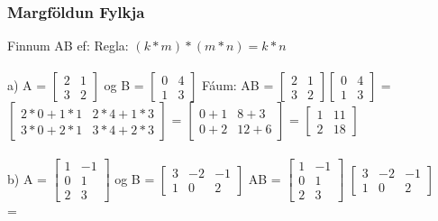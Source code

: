 \subsubsection{Margföldun Fylkja} 
Finnum AB ef: \quad Regla: $(k * m) * (m * n) = k*n$\\
\\
a) A = 
$\begin{bmatrix}
    2 & 1 \\
    3 & 2
\end{bmatrix}$ og B = 
$\begin{bmatrix}
    0 & 4 \\
    1 & 3    
\end{bmatrix}$ Fáum: AB = 
$\begin{bmatrix}
    2 & 1 \\
    3 & 2
\end{bmatrix} 
\begin{bmatrix}
    0 & 4 \\
    1 & 3    
\end{bmatrix}$ = 
$\begin{bmatrix}
    2*0 + 1*1 & 2*4 + 1*3  \\
    3*0 + 2*1 & 3*4 + 2*3
\end{bmatrix}$\vspace*{0.7em} =
$\begin{bmatrix}
    0 + 1 & 8 + 3  \\
    0 + 2 & 12 + 6
\end{bmatrix}$ =
$\begin{bmatrix}
    1 & 11 \\
    2 & 18
\end{bmatrix}$\\ \\
b) A =
$\begin{bmatrix}
    1 & -1 \\
    0 & 1 \\
    2 & 3
\end{bmatrix}$ og B = 
$\begin{bmatrix}
    3 & -2 & -1 \\
    1 & 0 & 2    
\end{bmatrix}$ AB = 
$\begin{bmatrix}
    1 & -1 \\
    0 & 1 \\
    2 & 3
\end{bmatrix}$
$\begin{bmatrix}
    3 & -2 & -1 \\
    1 & 0 & 2    
\end{bmatrix}$\vspace*{0.7em} \\ =  
